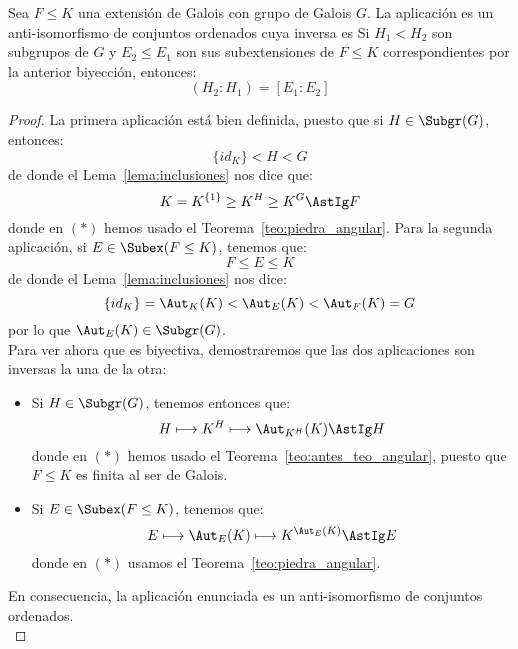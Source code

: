 \begin{teo} 
    Sea $F\leq K$ una extensión de Galois con grupo de Galois $G$. La aplicación 
    es un anti-isomorfismo de conjuntos ordenados cuya inversa es 
    Si $H_1< H_2$ son subgrupos de $G$ y $E_2\leq E_1$ son sus subextensiones de $F\leq K$ correspondientes por la anterior biyección, entonces:
    \begin{equation*}
        (H_2:H_1) = [E_1:E_2]
    \end{equation*}
    \begin{proof}
        La primera aplicación está bien definida, puesto que si $H\in \Subgr(G)$, entonces:
        \begin{equation*}
            \{id_K\} < H < G
        \end{equation*}
        de donde el Lema~\ref{lema:inclusiones} nos dice que:
        \begin{equation*}
            K = K^{\{1\}} \geq K^H \geq K^G \AstIg F
        \end{equation*}
        donde en $(\ast)$ hemos usado el Teorema~\ref{teo:piedra_angular}. Para la segunda aplicación, si ${E\in \Subex(F\leq K)}$, tenemos que:
        \begin{equation*}
            F\leq E \leq K
        \end{equation*}
        de donde el Lema~\ref{lema:inclusiones} nos dice:
        \begin{equation*}
            \{id_K\} = \Aut_K(K) < \Aut_E(K) < \Aut_F(K) = G
        \end{equation*}
        por lo que $\Aut_E(K)\in \Subgr(G)$.\\

        \noindent
        Para ver ahora que es biyectiva, demostraremos que las dos aplicaciones son inversas la una de la otra:
        \begin{itemize}
            \item Si $H\in \Subgr(G)$, tenemos entonces que:
                \begin{equation*}
                    H\longmapsto K^H \longmapsto \Aut_{K^H}(K) \AstIg H
                \end{equation*}
                donde en $(\ast)$ hemos usado el Teorema~\ref{teo:antes_teo_angular}, puesto que $F\leq K$ es finita al ser de Galois.
            \item Si $E\in \Subex(F\leq K)$, tenemos que:
                \begin{equation*}
                    E\longmapsto \Aut_E(K) \longmapsto K^{\Aut_E(K)} \AstIg E
                \end{equation*}
                donde en $(\ast)$ usamos el Teorema~\ref{teo:piedra_angular}.
        \end{itemize}
        En consecuencia, la aplicación enunciada es un anti-isomorfismo de conjuntos ordenados.\\


\end{proof}
\end{teo}
